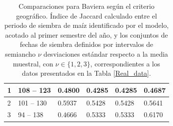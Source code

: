 \begin{table}[]
\begin{tabular}{llllll}
		\multicolumn{1}{l|}{1}                                  & \multicolumn{1}{l|}{108 -- 123}                                                                                               & \multicolumn{1}{l|}{0.4800}                  & \multicolumn{1}{l|}{0.4285}                 & \multicolumn{1}{l|}{0.4285}                  & 0.4687                 \\ \hline
		\multicolumn{1}{l|}{2}                                  & \multicolumn{1}{l|}{101 -- 130}                                                                                               & \multicolumn{1}{l|}{0.5937}                  & \multicolumn{1}{l|}{0.5428}                 & \multicolumn{1}{l|}{0.5428}                  & 0.5641                 \\ \hline
		\multicolumn{1}{l|}{3}                                  & \multicolumn{1}{l|}{94 -- 138}                                                                                                & \multicolumn{1}{l|}{0.4666}                  & \multicolumn{1}{l|}{0.5333}                 & \multicolumn{1}{l|}{0.5333}                  & 0.6170                 \\ \hline
	\end{tabular}
	\caption{Comparaciones para Baviera según el criterio geográfico. Índice de Jaccard calculado entre el periodo de siembra de maíz identificado por el modelo, acotado al primer semestre del año, y los conjuntos de fechas de siembra definidos por intervalos de semiancho $\nu$ desviaciones estándar respecto a la media muestral, con $\nu\in\{1,2,3\}$, correspondientes a los datos presentados en la Tabla \ref{Real_data}.}
	\label{Tab:Comparions_Bavaria_Geo}
\end{table}



